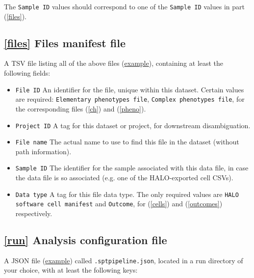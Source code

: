 \documentclass[14pt]{article}
\begin{document}
The \colorbox{yellow!25}{\texttt{Sample ID}} values should correspond to one of the \colorbox{yellow!25}{\texttt{Sample ID}} values in part (\ref{files}).

\subsection*{\ref{files} Files manifest file} A TSV file listing all of the above files (\href{https://github.com/nadeemlab/SPT/blob/main/tests/data/file_manifest.tsv}{example}), containing at least the following fields:

\begin{itemize}
  \itemsep0em
  \item[]{\colorbox{yellow!25}{\texttt{File ID}} \hspace{0.5pc} An identifier for the file, unique within this dataset. Certain values are required: \colorbox{gray!20}{\texttt{Elementary phenotypes file}}, \colorbox{gray!20}{\texttt{Complex phenotypes file}}, for the corresponding files (\ref{ch}) and (\ref{pheno}).}
  \item[]{\colorbox{yellow!25}{\texttt{Project ID}} \hspace{0.5pc} A tag for this dataset or project, for downstream disambiguation.}
  \item[]{\colorbox{yellow!25}{\texttt{File name}} \hspace{0.5pc} The actual name to use to find this file in the dataset (without path information).}
  \item[]{\colorbox{yellow!25}{\texttt{Sample ID}} \hspace{0.5pc} The identifier for the sample associated with this data file, in case the data file is so associated (e.g. one of the HALO-exported cell CSVs).}
  \item[]{\colorbox{yellow!25}{\texttt{Data type}} \hspace{0.5pc} A tag for this file data type. The only required values are \colorbox{gray!20}{\texttt{HALO software cell manifest}} and \colorbox{gray!20}{\texttt{Outcome}}, for (\ref{cells}) and (\ref{outcomes}) respectively.}
\end{itemize}

\subsection*{\ref{run} Analysis configuration file}
A JSON file (\href{https://github.com/nadeemlab/SPT/blob/main/tests/integration_tests/example_config_files/density.json}{example}) called \colorbox{gray!20}{\texttt{.spt{\textunderscore}pipeline.json}}, located in a run directory of your choice, with at least the following keys:
\end{document}
